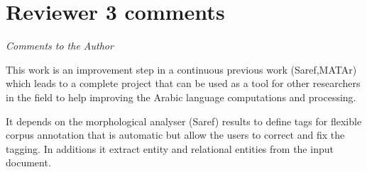 \section*{Reviewer 3 comments} 
\textit{Comments to the Author}



This work is an improvement step in a continuous previous work 
(Saref,MATAr) which leads to a complete project that can be 
used as a tool for other researchers in the field to help 
improving the Arabic language computations and processing.


It depends on the morphological analyser (Saref) results 
to define tags for flexible corpus annotation that is automatic 
but allow the users to correct and fix the tagging. 
In additions it extract entity and relational entities from 
the input document.


